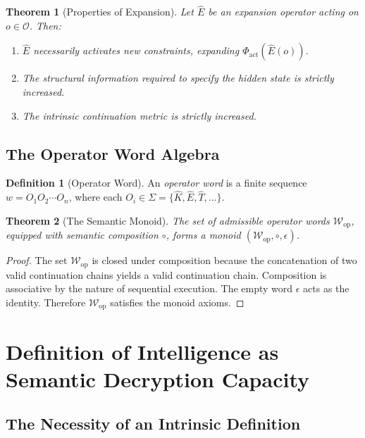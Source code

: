 \documentclass[12pt,anyside]{book}
\theoremstyle{plain}
\newtheorem{theorem}{Theorem}[chapter]
\theoremstyle{definition}
\newtheorem{definition}{Definition}[chapter]
\newcommand{\Ehat}{\hat{E}}            %
\newcommand{\Ocal}{\mathcal{O}}        %
\begin{document}
\begin{theorem}[Properties of Expansion]\label{thm:expand}
Let $\Ehat$ be an expansion operator acting on $o \in \Ocal$. Then:
\begin{enumerate}
\item $\Ehat$ necessarily activates new constraints, expanding $\Phi_{\mathrm{act}}(\Ehat(o))$.
\item The structural information required to specify the hidden state is strictly increased.
\item The intrinsic continuation metric is strictly increased.
\end{enumerate}
\end{theorem}

\section{The Operator Word Algebra}

\begin{definition}[Operator Word]\label{def:opword}
An \emph{operator word} is a finite sequence $w = O_1 O_2 \cdots O_n$, where each $O_i \in \Sigma = \{\hat{K}, \Ehat, \hat{T}, \ldots\}$.
\end{definition}

\begin{theorem}[The Semantic Monoid]\label{thm:monoid}
The set of admissible operator words $\mathcal{W}_{\mathrm{op}}$, equipped with semantic composition $\circ$, forms a monoid $(\mathcal{W}_{\mathrm{op}}, \circ, \epsilon)$.
\end{theorem}

\begin{proof}
The set $\mathcal{W}_{\mathrm{op}}$ is closed under composition because the concatenation of two valid continuation chains yields a valid continuation chain. Composition is associative by the nature of sequential execution. The empty word $\epsilon$ acts as the identity. Therefore $\mathcal{W}_{\mathrm{op}}$ satisfies the monoid axioms.
\end{proof}

\chapter{Definition of Intelligence as Semantic Decryption Capacity}

\section{The Necessity of an Intrinsic Definition}
\end{document}
